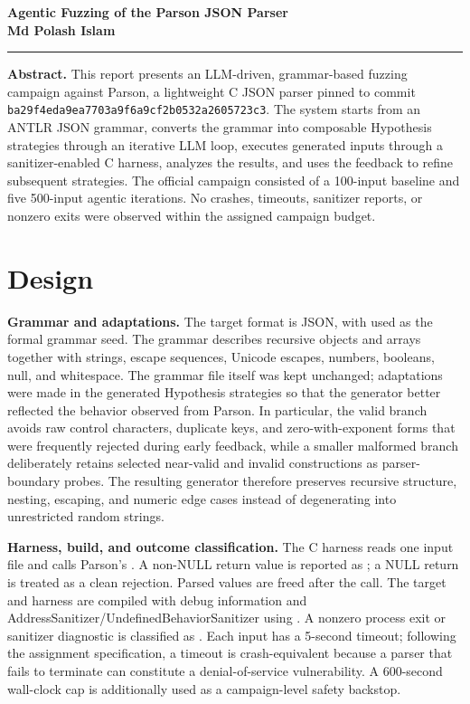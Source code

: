 \documentclass[10pt,a4paper]{article}
\begin{document}
\begin{center}
    {\Large\bfseries Agentic Fuzzing of the Parson JSON Parser}\\[3pt]
    {\normalsize\textbf{Md Polash Islam}}\\
    
\end{center}

\vspace{2pt}
\hrule
\vspace{5pt}

\textbf{Abstract.}
This report presents an LLM-driven, grammar-based fuzzing campaign against Parson, a lightweight C JSON parser pinned to commit
\texttt{ba29f4eda9ea7703a9f6a9cf2b0532a2605723c3}. The system starts from an ANTLR JSON grammar, converts the grammar into composable
Hypothesis strategies through an iterative LLM loop, executes generated inputs through a sanitizer-enabled C harness, analyzes the
results, and uses the feedback to refine subsequent strategies. The official campaign consisted of a 100-input baseline and five
500-input agentic iterations. No crashes, timeouts, sanitizer reports, or nonzero exits were observed within the assigned campaign budget.

\section{Design}

\textbf{Grammar and adaptations.}
The target format is JSON, with  used as the formal grammar seed. The grammar describes recursive objects and
arrays together with strings, escape sequences, Unicode escapes, numbers, booleans, null, and whitespace. The grammar file itself was
kept unchanged; adaptations were made in the generated Hypothesis strategies so that the generator better reflected the behavior
observed from Parson. In particular, the valid branch avoids raw control characters, duplicate keys, and zero-with-exponent forms that
were frequently rejected during early feedback, while a smaller malformed branch deliberately retains selected near-valid and invalid
constructions as parser-boundary probes. The resulting generator therefore preserves recursive structure, nesting, escaping, and numeric
edge cases instead of degenerating into unrestricted random strings.

\textbf{Harness, build, and outcome classification.}
The C harness reads one input file and calls Parson's . A non-NULL return value is reported as
; a NULL return is treated as a clean  rejection. Parsed values are freed after the call.
The target and harness are compiled with debug information and AddressSanitizer/UndefinedBehaviorSanitizer using
. A nonzero process exit or sanitizer diagnostic is classified as
. Each input has a 5-second timeout; following the assignment specification, a timeout is crash-equivalent because a
parser that fails to terminate can constitute a denial-of-service vulnerability. A 600-second wall-clock cap is additionally used as
a campaign-level safety backstop.
\end{document}
